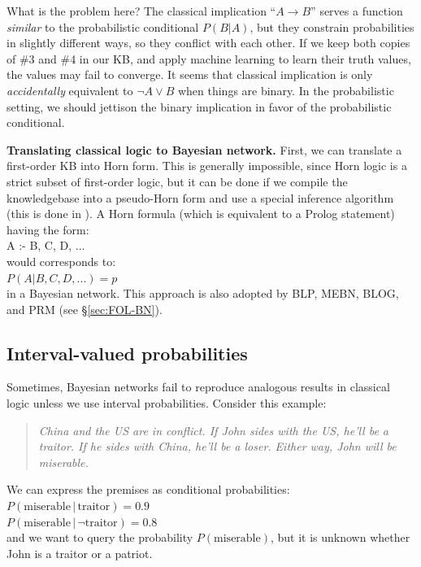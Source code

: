 What is the problem here?  The classical implication ``$A \rightarrow B$'' serves a function \textit{similar} to the probabilistic conditional $P(B|A)$, but they constrain probabilities in slightly different ways, so they conflict with each other.  If we keep both copies of \#3 and \#4 in our KB, and apply machine learning to learn their truth values, the values may fail to converge.  It seems that classical implication is only \emph{accidentally} equivalent to $\neg A \vee B$ when things are binary.  In the probabilistic setting, we should jettison the binary implication in favor of the probabilistic conditional.

\textbf{Translating classical logic to Bayesian network.}  First, we can translate a first-order KB into Horn form.  This is generally impossible, since Horn logic is a strict subset of first-order logic, but it can be done if we compile the knowledgebase into a pseudo-Horn form and use a special inference algorithm (this is done in \citep*{Stickel1988}).  A Horn formula (which is equivalent to a Prolog statement) having the form:\\
\hspace*{1cm} \ttfamily A :- B, C, D, ... \rmfamily\\
would corresponds to:\\
\hspace*{1cm} $ P(A | B, C, D, ...) = p $\\
in a Bayesian network.  This approach is also adopted by BLP, MEBN, BLOG, and PRM (see \S\ref{sec:FOL-BN}).

\subsection{Interval-valued probabilities}
\label{sec:intervalP}

Sometimes, Bayesian networks fail to reproduce analogous results in classical logic unless we use interval probabilities.  Consider this example:
\begin{quote}
\emph{China and the US are in conflict. If John sides with the US, he'll be a traitor. If he sides with China, he'll be a loser. Either way, John will be miserable.}
\end{quote}

We can express the premises as conditional probabilities:\\
\hspace*{1cm} $P(\mbox{miserable} \,|\, \mbox{traitor} ) = 0.9$ \\
\hspace*{1cm} $P(\mbox{miserable} \,|\, \neg\mbox{traitor} ) = 0.8$ \\
and we want to query the probability $P(\mbox{miserable})$, but it is unknown whether John is a traitor or a patriot.

